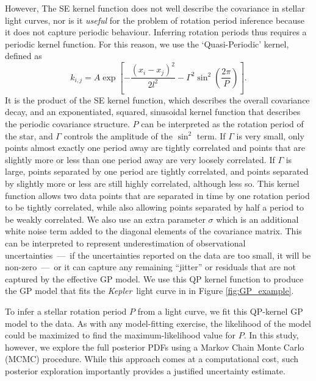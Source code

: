 \documentclass[useAMS, usenatbib, preprint, 12pt]{aastex}
\newcommand{\Kepler}{{\it Kepler}}
\begin{document}
However, The SE kernel function does not well describe the covariance
in stellar light curves, nor is it {\it useful} for the problem of
rotation period inference because it does not capture periodic behaviour.
Inferring rotation periods thus requires a periodic kernel
function.  For this reason, we use the `Quasi-Periodic' kernel, defined as
\citep{Rasmussen2005}
\begin{equation}
k_{i,j} = A \exp \left[-\frac{(x_i - x_j)^2}{2l^2} -
\Gamma^2 \sin^2\left(\frac{2\pi}{P}\right) \right].
\end{equation}
\label{eq:QP}
It is the product of the SE kernel function, which describes the overall
covariance decay, and an exponentiated, squared, sinusoidal kernel function
that describes the periodic covariance structure.
$P$ can be interpreted as the rotation period of the star, and $\Gamma$
controls the amplitude of the $\sin^2$ term.
If $\Gamma$ is very small, only points almost exactly one period away are
tightly correlated and points that are slightly more or less than one period
away are very loosely correlated.
If $\Gamma$ is large, points separated by one period are tightly
correlated, and points separated by slightly more or less are still highly
correlated, although less so.
This kernel function allows two data points that are separated in time by one
rotation period to be tightly correlated, while also allowing
points separated by half a period to be weakly correlated.
We also use an extra parameter $\sigma$ which is an additional white noise
term added to the diagonal elements of the covariance matrix.
This can be interpreted to represent underestimation of observational
uncertainties~---~if the uncertainties reported on the data are too small, it
will be non-zero~---~or it can capture any remaining ``jitter'' or residuals
that are not captured by the effective GP model.
We use this QP kernel function to produce the GP model
that fits the \Kepler\ light curve in in Figure \ref{fig:GP_example}.

To infer a stellar rotation period $P$ from a light curve, we fit this QP-kernel
GP model to the data.  As with any model-fitting exercise, the likelihood
of the model could be maximized to find the maximum-likelihood value for $P$.
In this study, however, we explore the full posterior PDFs using a Markov
Chain Monte Carlo (MCMC) procedure.  While
this approach comes at a computational cost, such posterior exploration
importantly provides a justified uncertainty estimate.
\end{document}
